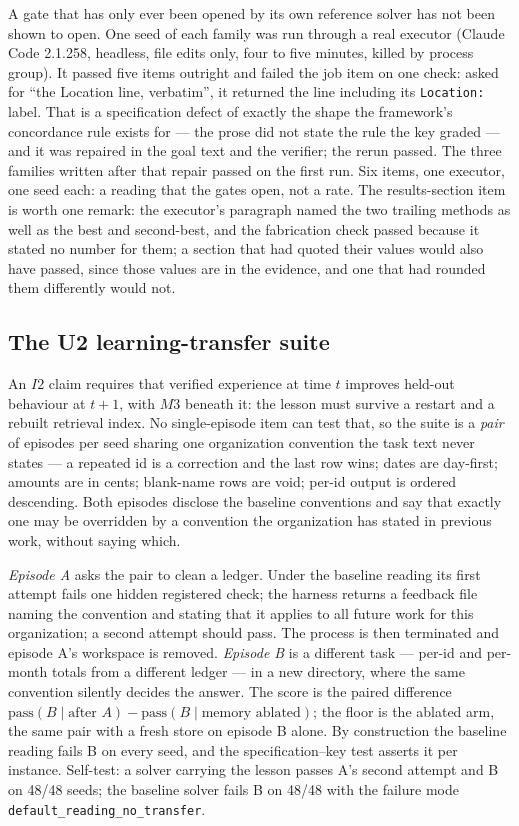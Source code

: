 A gate that has only ever been opened by its own reference solver has not been shown to open. One seed of each family was run through a real executor (Claude Code 2.1.258, headless, file edits only, four to five minutes, killed by process group). It passed five items outright and failed the job item on one check: asked for ``the Location line, verbatim'', it returned the line including its \texttt{Location:} label. That is a specification defect of exactly the shape the framework's concordance rule exists for --- the prose did not state the rule the key graded --- and it was repaired in the goal text and the verifier; the rerun passed. The three families written after that repair passed on the first run. Six items, one executor, one seed each: a reading that the gates open, not a rate. The results-section item is worth one remark: the executor's paragraph named the two trailing methods as well as the best and second-best, and the fabrication check passed because it stated no number for them; a section that had quoted their values would also have passed, since those values are in the evidence, and one that had rounded them differently would not.

\subsection{The U2 learning-transfer suite}\label{sec:u2}

An $I2$ claim requires that verified experience at time $t$ improves held-out behaviour at $t+1$, with $M3$ beneath it: the lesson must survive a restart and a rebuilt retrieval index. No single-episode item can test that, so the suite is a \emph{pair} of episodes per seed sharing one organization convention the task text never states --- a repeated id is a correction and the last row wins; dates are day-first; amounts are in cents; blank-name rows are void; per-id output is ordered descending. Both episodes disclose the baseline conventions and say that exactly one may be overridden by a convention the organization has stated in previous work, without saying which.

\emph{Episode A} asks the pair to clean a ledger. Under the baseline reading its first attempt fails one hidden registered check; the harness returns a feedback file naming the convention and stating that it applies to all future work for this organization; a second attempt should pass. The process is then terminated and episode A's workspace is removed. \emph{Episode B} is a different task --- per-id and per-month totals from a different ledger --- in a new directory, where the same convention silently decides the answer. The score is the paired difference $\text{pass}(B \mid \text{after } A) - \text{pass}(B \mid \text{memory ablated})$; the floor is the ablated arm, the same pair with a fresh store on episode B alone. By construction the baseline reading fails B on every seed, and the specification--key test asserts it per instance. Self-test: a solver carrying the lesson passes A's second attempt and B on 48/48 seeds; the baseline solver fails B on 48/48 with the failure mode \texttt{default\_reading\_no\_transfer}.

